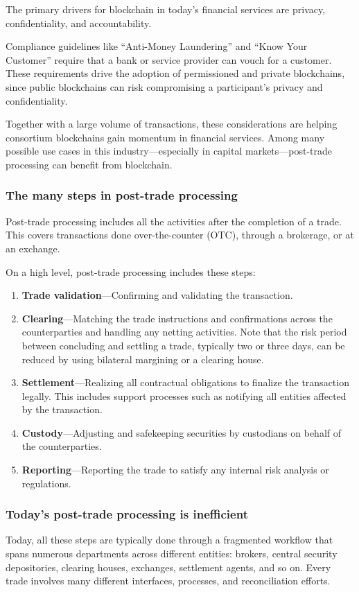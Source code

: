 The primary drivers for blockchain in today's financial services are privacy, confidentiality, and accountability. 

Compliance guidelines like ``Anti-Money Laundering” and ``Know Your Customer” require that a bank or service provider can vouch for a customer. These requirements drive the adoption of permissioned and private blockchains, since public blockchains can risk compromising a participant's privacy and confidentiality. 

Together with a large volume of transactions, these considerations are helping consortium blockchains gain momentum in financial services. Among many possible use cases in this industry---especially in capital markets---post-trade processing can benefit from blockchain.

\subsubsection{The many steps in post-trade processing}
Post-trade processing includes all the activities after the completion of a trade.
This covers transactions done over-the-counter (OTC), through a brokerage, or at an exchange.

On a high level, post-trade processing includes these steps:
\begin{enumerate}
\item \textbf{Trade validation}---Confirming and validating the transaction. 
\item \textbf{Clearing}---Matching the trade instructions and confirmations across the counterparties and handling any netting activities. Note that the risk period between concluding and settling a trade, typically two or three days, can be reduced by using bilateral margining or a clearing house. 
\item \textbf{Settlement}---Realizing all contractual obligations to finalize the transaction legally. This includes support processes such as notifying all entities affected by the transaction.
\item \textbf{Custody}---Adjusting and safekeeping securities by custodians on behalf of the counterparties. 
\item \textbf{Reporting}---Reporting the trade to satisfy any internal risk analysis or regulations. 
\end{enumerate}

\subsubsection{Today's post-trade processing is inefficient}
Today, all these steps are typically done through a fragmented workflow that spans numerous departments across different entities: brokers, central security depositories, clearing houses, exchanges, settlement agents, and so on. 
Every trade involves many different interfaces, processes, and reconciliation efforts. 

